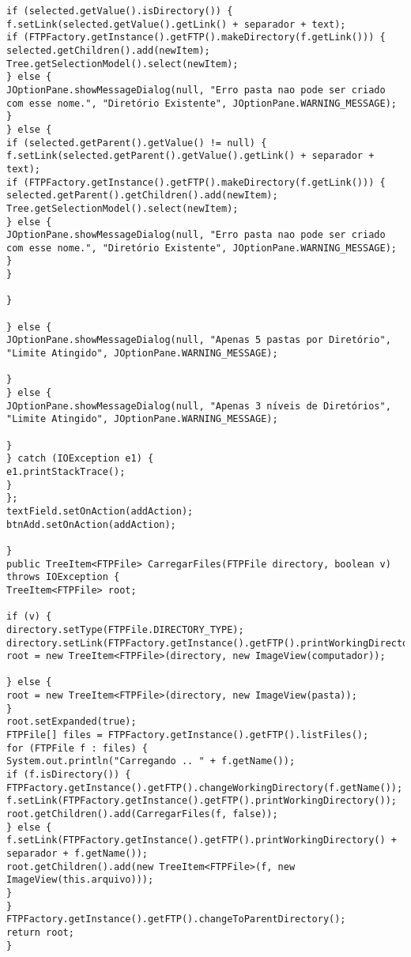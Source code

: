 \documentclass[12pt]{article}
\begin{document}
\begin{lstlisting}
if (selected.getValue().isDirectory()) {
f.setLink(selected.getValue().getLink() + separador + text);
if (FTPFactory.getInstance().getFTP().makeDirectory(f.getLink())) {
selected.getChildren().add(newItem);
Tree.getSelectionModel().select(newItem);
} else {
JOptionPane.showMessageDialog(null, "Erro pasta nao pode ser criado com esse nome.", "Diretório Existente", JOptionPane.WARNING_MESSAGE);
}
} else {
if (selected.getParent().getValue() != null) {
f.setLink(selected.getParent().getValue().getLink() + separador + text);
if (FTPFactory.getInstance().getFTP().makeDirectory(f.getLink())) {
selected.getParent().getChildren().add(newItem);
Tree.getSelectionModel().select(newItem);
} else {
JOptionPane.showMessageDialog(null, "Erro pasta nao pode ser criado com esse nome.", "Diretório Existente", JOptionPane.WARNING_MESSAGE);
}
}

}

} else {
JOptionPane.showMessageDialog(null, "Apenas 5 pastas por Diretório", "Limite Atingido", JOptionPane.WARNING_MESSAGE);

}
} else {
JOptionPane.showMessageDialog(null, "Apenas 3 níveis de Diretórios", "Limite Atingido", JOptionPane.WARNING_MESSAGE);

}
} catch (IOException e1) {
e1.printStackTrace();
}
};
textField.setOnAction(addAction);
btnAdd.setOnAction(addAction);

}
public TreeItem<FTPFile> CarregarFiles(FTPFile directory, boolean v) throws IOException {
TreeItem<FTPFile> root;

if (v) {
directory.setType(FTPFile.DIRECTORY_TYPE);
directory.setLink(FTPFactory.getInstance().getFTP().printWorkingDirectory());
root = new TreeItem<FTPFile>(directory, new ImageView(computador));

} else {
root = new TreeItem<FTPFile>(directory, new ImageView(pasta));
}
root.setExpanded(true);
FTPFile[] files = FTPFactory.getInstance().getFTP().listFiles();
for (FTPFile f : files) {
System.out.println("Carregando .. " + f.getName());
if (f.isDirectory()) {
FTPFactory.getInstance().getFTP().changeWorkingDirectory(f.getName());
f.setLink(FTPFactory.getInstance().getFTP().printWorkingDirectory());
root.getChildren().add(CarregarFiles(f, false));
} else {
f.setLink(FTPFactory.getInstance().getFTP().printWorkingDirectory() + separador + f.getName());
root.getChildren().add(new TreeItem<FTPFile>(f, new ImageView(this.arquivo)));
}
}
FTPFactory.getInstance().getFTP().changeToParentDirectory();
return root;
}
\end{lstlisting}
\end{document}
